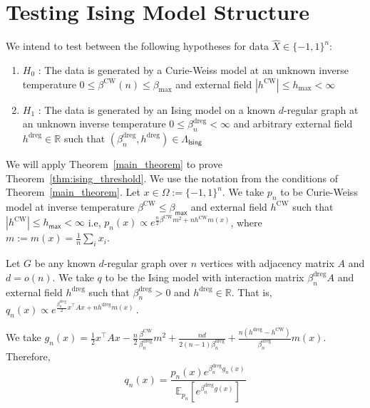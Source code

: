 \documentclass[final,12pt]{colt2018}
\begin{document}
\section{Testing Ising Model Structure}
\label{sec:ising_model_result}
We intend to test between the following hypotheses for data $\hat{X} \in \{-1,1\}^n$:
\begin{enumerate}
\item[ ]
$H_0$ : The data is generated by a Curie-Weiss model at an unknown inverse temperature $0 \leq  \beta^{\mathrm{CW}}(n) \leq \beta_{\textrm{max}}$ and external field $|h^{\mathrm{CW}}| \leq h_{\textrm{max}} < \infty$
\item[ ]
$H_1$ : The data is generated by an Ising model on a known $d$-regular graph at an unknown inverse temperature $0\leq\beta^{\mathrm{dreg}}_n < \infty$ and arbitrary external field $h^{\mathrm{dreg}} \in \mathbb{R}$ such that $(\beta^{\mathrm{dreg}}_n,h^{\mathrm{dreg}}) \in \Lambda_{\mathsf{Ising}}$
\end{enumerate}



We will apply Theorem~\ref{main_theorem} to prove Theorem~\ref{thm:ising_threshold}. We use the notation from the conditions of Theorem~\ref{main_theorem}. Let $x \in \Omega := \{-1,1\}^n$. We take $p_n$ to be Curie-Weiss model at inverse temperature $\beta^{\mathrm{CW}} \leq \beta_{\mathsf{max}}$ and external field $h^{\mathrm{CW}}$ such that $|h^{\mathrm{CW}}|\leq h_{\mathsf{max}} < \infty$ i.e, 
$p_n(x) \propto e^{\frac{n}{2}\beta^{\mathrm{CW}} m^2 + nh^{\mathrm{CW}}m(x)}$, 
where $m := m(x) = \frac{1}{n}\sum_i x_i$. 

Let $G$ be any known $d$-regular graph over $n$ vertices with adjacency matrix $A$ and $d=o(n)$. We take $q$ to be the Ising model with interaction matrix $\beta^{\mathrm{dreg}}_n A$ and external field $h^{\mathrm{dreg}}$ such that $\beta^{\mathrm{dreg}}_n > 0$ and $h^{\mathrm{dreg}} \in \mathbb{R}$. That is,
$q_n(x) \propto e^{\frac{\beta^{\mathrm{dreg}}_n}{2}x^{\intercal}Ax + nh^{\mathrm{dreg}}m(x)}\,.$

We take $g_n(x) = \frac{1}{2}x^{\intercal}Ax - \frac{n}{2}\frac{\beta^{\mathrm{CW}}}{\beta^{\mathrm{dreg}}_n} m^2 + \frac{nd}{2(n-1)\beta^{\mathrm{dreg}}_n} + \frac{n(h^{\mathrm{dreg}} -h^{\mathrm{CW}})}{\beta^{\mathrm{dreg}}_n}m(x)$. Therefore, $$q_n(x) =  \frac{p_n(x)e^{\beta^{\mathrm{dreg}}_n g_n(x)}}{\mathbb{E}_{p_n} [e^{\beta^{\mathrm{dreg}}_n g(x)}]}$$
\end{document}
